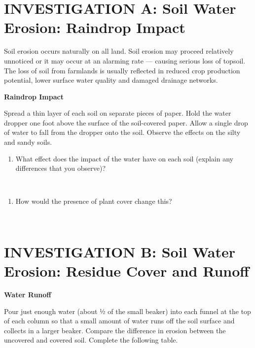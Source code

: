 \documentclass[
  letterpaper,
  twocolumn,
  portrait]{scrbook}
\providecommand{\tightlist}{%
  \setlength{\itemsep}{0pt}\setlength{\parskip}{0pt}}\usepackage{longtable,booktabs,array}
\begin{document}
\hypertarget{investigation-a-soil-water-erosion-raindrop-impact}{%
\section{INVESTIGATION A: Soil Water Erosion: Raindrop
Impact}\label{investigation-a-soil-water-erosion-raindrop-impact}}

Soil erosion occurs naturally on all land. Soil erosion may proceed
relatively unnoticed or it may occur at an alarming rate --- causing
serious loss of topsoil. The loss of soil from farmlands is usually
reflected in reduced crop production potential, lower surface water
quality and damaged drainage networks.

\textbf{Raindrop Impact}

Spread a thin layer of each soil on separate pieces of paper. Hold the
water dropper one foot above the surface of the soil-covered paper.
Allow a single drop of water to fall from the dropper onto the soil.
Observe the effects on the silty and sandy soils.

\begin{enumerate}
\def\labelenumi{\arabic{enumi}.}
\tightlist
\item
  What effect does the impact of the water have on each soil (explain
  any differences that you observe)?
\end{enumerate}

~ ~ ~

\begin{enumerate}
\def\labelenumi{\arabic{enumi}.}
\setcounter{enumi}{1}
\tightlist
\item
  How would the presence of plant cover change this?
\end{enumerate}

~ ~ ~

\hypertarget{investigation-b-soil-water-erosion-residue-cover-and-runoff}{%
\section{INVESTIGATION B: Soil Water Erosion: Residue Cover and
Runoff}\label{investigation-b-soil-water-erosion-residue-cover-and-runoff}}

\textbf{Water Runoff}

Pour just enough water (about ½ of the small beaker) into each funnel at
the top of each column so that a small amount of water runs off the soil
surface and collects in a larger beaker. Compare the difference in
erosion between the uncovered and covered soil. Complete the following
table.
\end{document}

